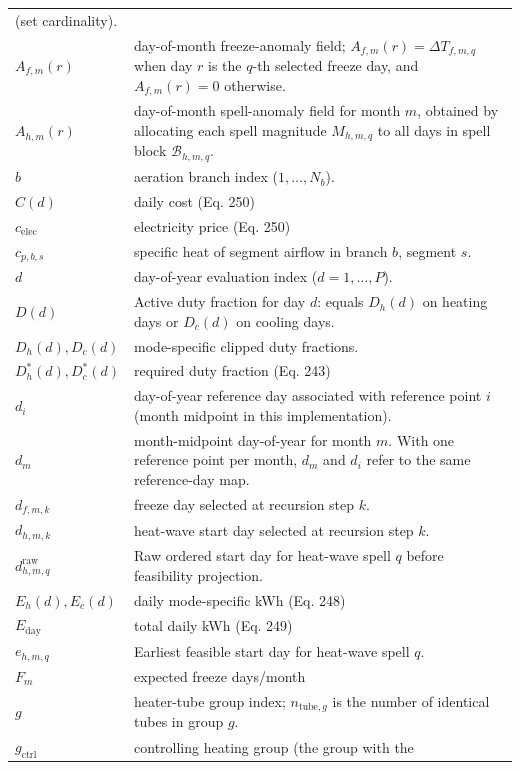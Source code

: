 {\begin{longtable}[]{@{}
  >{\raggedright\arraybackslash}p{}
  >{\raggedright\arraybackslash}p{}@{}}
(set cardinality). \\
\(A_{f,m}(r)\) & day-of-month freeze-anomaly field;
\(A_{f,m}(r)=\Delta T_{f,m,q}\) when day \(r\) is the \(q\)-th selected
freeze day, and \(A_{f,m}(r)=0\) otherwise. \\
\(A_{h,m}(r)\) & day-of-month spell-anomaly field for month \(m\),
obtained by allocating each spell magnitude \(M_{h,m,q}\) to all days in
spell block \(\mathcal{B}_{h,m,q}\). \\
\(b\) & aeration branch index (\(1,\dots,N_b\)). \\
\(C(d)\) & daily cost (Eq. 250) \\
\(c_{\mathrm{elec}}\) & electricity price (Eq. 250) \\
\(c_{p,b,s}\) & specific heat of segment airflow in branch \(b\),
segment \(s\). \\
\(d\) & day-of-year evaluation index (\(d=1,\dots,P\)). \\
\(D(d)\) & Active duty fraction for day \(d\): equals \(D_h(d)\) on
heating days or \(D_c(d)\) on cooling days. \\
\(D_h(d),D_c(d)\) & mode-specific clipped duty fractions. \\
\(D_h^*(d),D_c^*(d)\) & required duty fraction (Eq. 243) \\
\(d_i\) & day-of-year reference day associated with reference point
\(i\) (month midpoint in this implementation). \\
\(d_m\) & month-midpoint day-of-year for month \(m\). With one reference
point per month, \(d_m\) and \(d_i\) refer to the same reference-day
map. \\
\(d_{f,m,k}\) & freeze day selected at recursion step \(k\). \\
\(d_{h,m,k}\) & heat-wave start day selected at recursion step \(k\). \\
\(d_{h,m,q}^{\mathrm{raw}}\) & Raw ordered start day for heat-wave spell
\(q\) before feasibility projection. \\
\(E_h(d),E_c(d)\) & daily mode-specific kWh (Eq. 248) \\
\(E_{\mathrm{day}}\) & total daily kWh (Eq. 249) \\
\(e_{h,m,q}\) & Earliest feasible start day for heat-wave spell
\(q\). \\
\(F_m\) & expected freeze days/month \\
\(g\) & heater-tube group index; \(n_{\mathrm{tube},g}\) is the number
of identical tubes in group \(g\). \\
\(g_{\mathrm{ctrl}}\) & controlling heating group (the group with the

\end{longtable}}
